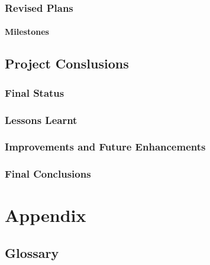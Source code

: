 \documentclass[a4paper,12pt]{report}
\begin{document}
\section{Revised Plans}





\subsection{Milestones}

\todo


\chapter{Project Conslusions}

\section{Final Status}



\section{Lessons Learnt}



\section{Improvements and Future Enhancements}



\section{Final Conclusions}

\todo


\part*{Appendix}

\appendix


\chapter{Glossary}
\end{document}
